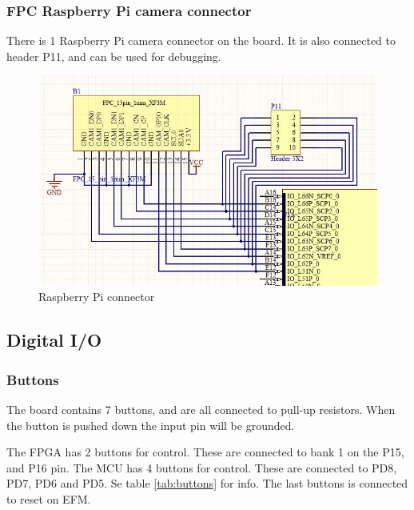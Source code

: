 \subsubsection{FPC Raspberry Pi camera connector}
There is 1 Raspberry Pi camera connector on the board. It is also connected to header P11, and can be used for debugging.

\begin{figure}
    \includegraphics[width=\linewidth]{img/fpc_header.jpg}
    \caption{Raspberry Pi connector}
    \label{fig:fpc_header}
\end{figure}

\subsection{Digital I/O}
\subsubsection{Buttons}
The board contains 7 buttons, and are all connected to pull-up resistors. When the button is pushed down the input pin will be grounded. 

The FPGA has 2 buttons for control. These are connected to bank 1 on the P15, and P16 pin.
The MCU has 4 buttons for control. These are connected to PD8, PD7, PD6 and PD5. Se table \ref{tab:buttons} for info.
The last buttons is connected to reset on EFM. 


